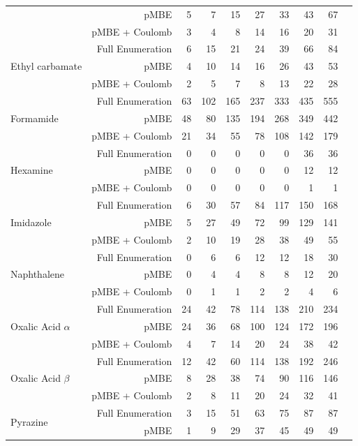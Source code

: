 \begin{longtable}{lrrrrrrrrr}
 & pMBE & 5 & 7 & 15 & 27 & 33 & 43 & 67 \\
 & pMBE + Coulomb & 3 & 4 & 8 & 14 & 16 & 20 & 31 \\
\cline{1-9}
\multirow[c]{3}{*}{Ethyl carbamate} & Full Enumeration & 6 & 15 & 21 & 24 & 39 & 66 & 84 \\
 & pMBE & 4 & 10 & 14 & 16 & 26 & 43 & 53 \\
 & pMBE + Coulomb & 2 & 5 & 7 & 8 & 13 & 22 & 28 \\
\cline{1-9}
\multirow[c]{3}{*}{Formamide} & Full Enumeration & 63 & 102 & 165 & 237 & 333 & 435 & 555 \\
 & pMBE & 48 & 80 & 135 & 194 & 268 & 349 & 442 \\
 & pMBE + Coulomb & 21 & 34 & 55 & 78 & 108 & 142 & 179 \\
\cline{1-9}
\multirow[c]{3}{*}{Hexamine} & Full Enumeration & 0 & 0 & 0 & 0 & 0 & 36 & 36 \\
 & pMBE & 0 & 0 & 0 & 0 & 0 & 12 & 12 \\
 & pMBE + Coulomb & 0 & 0 & 0 & 0 & 0 & 1 & 1 \\
\cline{1-9}
\multirow[c]{3}{*}{Imidazole} & Full Enumeration & 6 & 30 & 57 & 84 & 117 & 150 & 168 \\
 & pMBE & 5 & 27 & 49 & 72 & 99 & 129 & 141 \\
 & pMBE + Coulomb & 2 & 10 & 19 & 28 & 38 & 49 & 55 \\
\cline{1-9}
\multirow[c]{3}{*}{Naphthalene} & Full Enumeration & 0 & 6 & 6 & 12 & 12 & 18 & 30 \\
 & pMBE & 0 & 4 & 4 & 8 & 8 & 12 & 20 \\
 & pMBE + Coulomb & 0 & 1 & 1 & 2 & 2 & 4 & 6 \\
\cline{1-9}
\multirow[c]{3}{*}{Oxalic Acid $\alpha$} & Full Enumeration & 24 & 42 & 78 & 114 & 138 & 210 & 234 \\
 & pMBE & 24 & 36 & 68 & 100 & 124 & 172 & 196 \\
 & pMBE + Coulomb & 4 & 7 & 14 & 20 & 24 & 38 & 42 \\
\cline{1-9}
\multirow[c]{3}{*}{Oxalic Acid $\beta$} & Full Enumeration & 12 & 42 & 60 & 114 & 138 & 192 & 246 \\
 & pMBE & 8 & 28 & 38 & 74 & 90 & 116 & 146 \\
 & pMBE + Coulomb & 2 & 8 & 11 & 20 & 24 & 32 & 41 \\
\cline{1-9}
\multirow[c]{3}{*}{Pyrazine} & Full Enumeration & 3 & 15 & 51 & 63 & 75 & 87 & 87 \\
 & pMBE & 1 & 9 & 29 & 37 & 45 & 49 & 49 \\

\end{longtable}
